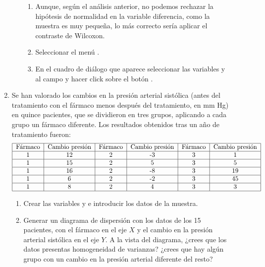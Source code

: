 \begin{description}
\begin{enumerate}[leftmargin=*]
\begin{enumerate}
\begin{indicacion}
\begin{enumerate}
\item Aunque, según el análisis anterior, no podemos rechazar la hipótesis de normalidad en la variable diferencia, como la muestra es muy pequeña, lo más correcto sería aplicar el contraste de Wilcoxon.
\item  Seleccionar el menú .
\item En el cuadro de diálogo que aparece seleccionar las variables  y  al campo  y hacer click sobre el botón .
\end{enumerate}
\end{indicacion}
\end{enumerate}


\item Se han valorado los cambios en la presión arterial sistólica (antes del tratamiento con el fármaco menos después del tratamiento, en mm Hg) en quince pacientes, que se dividieron en tres grupos, aplicando a cada grupo un fármaco diferente. Los resultados obtenidos tras un año de tratamiento fueron:
\[
\begin{tabular}{|c|c|c|c|c|c|}
\hline Fármaco & Cambio presión & Fármaco & Cambio presión & Fármaco & Cambio presión \\
\hline 1 & 12 & 2 & -3 & 3 & 1 \\
\hline 1 & 15 & 2 & 5 & 3 & 5 \\
\hline 1 & 16 & 2 & -8 & 3 & 19 \\
\hline 1 & 6 & 2 & -2 & 3 & 45 \\
\hline 1 & 8 & 2 & 4 & 3 & 3 \\
\hline
\end{tabular}
\]

\begin{enumerate}
\item Crear las variables  y  e
 introducir los datos de la muestra.

\item Generar un diagrama de dispersión con los datos de los 15 pacientes, con el fármaco en el eje $X$ y el cambio en la presión arterial sistólica en el eje $Y$. A la vista del diagrama, ¿crees que los datos presentas homogeneidad de varianzas? ¿crees que hay algún grupo con un cambio en la presión arterial diferente del resto?
    

\end{enumerate}
\end{enumerate}
\end{description}

